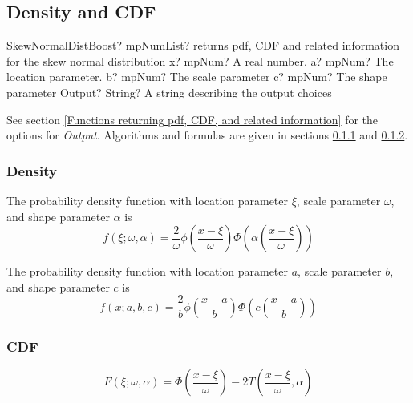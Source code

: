 \subsection{Density and CDF}

\begin{mpFunctionsExtract}
	\mpFunctionFive
	{SkewNormalDistBoost? mpNumList? returns pdf, CDF and related information for the skew normal distribution}
	{x? mpNum? A real number.}
	{a? mpNum? The location parameter.}
	{b? mpNum? The scale parameter}
	{c? mpNum? The shape parameter}
	{Output? String? A string describing the output choices}
\end{mpFunctionsExtract}


\vspace{0.3cm}
See section \ref{Functions returning pdf, CDF, and related information} for the options for {\itshape\sffamily Output}. Algorithms and formulas are given in sections \ref{SkewNormalDistributionDensity} and \ref{SkewNormalDistributionCDF}.




\subsubsection{Density}
\label{SkewNormalDistributionDensity}

The probability density function with location parameter $\xi$, scale parameter $\omega$, and shape parameter $\alpha$  is
\begin{equation} 
	f(\xi;\omega,\alpha)= \frac{2}{\omega} \phi \left(\frac{x-\xi}{\omega}\right)  \Phi \left(\alpha \left(\frac{x-\xi}{\omega}\right)\right)  
\end{equation}

The probability density function with location parameter $a$, scale parameter $b$, and shape parameter $c$  is
\begin{equation} 
	f(x;a,b,c)= \frac{2}{b} \phi \left(\frac{x-a}{b}\right)  \Phi \left(c \left(\frac{x-a}{b}\right)\right)  
\end{equation}


\subsubsection{CDF}
\label{SkewNormalDistributionCDF}

\begin{equation} 
	F(\xi;\omega,\alpha)=  \Phi \left(\frac{x-\xi}{\omega}\right) -  2T \left(\frac{x-\xi}{\omega}, \alpha \right)
\end{equation}

